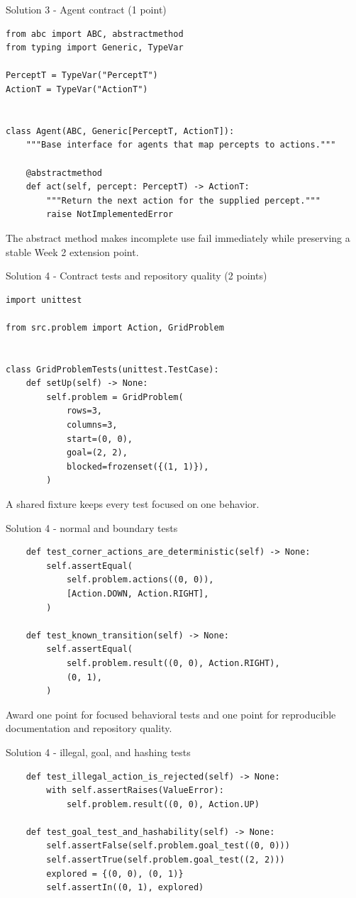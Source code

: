 \documentclass[aspectratio=169,11pt]{beamer}
\begin{document}
\begin{frame}[fragile]{Solution 3 - Agent contract (1 point)}
\begin{lstlisting}
from abc import ABC, abstractmethod
from typing import Generic, TypeVar

PerceptT = TypeVar("PerceptT")
ActionT = TypeVar("ActionT")


class Agent(ABC, Generic[PerceptT, ActionT]):
    """Base interface for agents that map percepts to actions."""

    @abstractmethod
    def act(self, percept: PerceptT) -> ActionT:
        """Return the next action for the supplied percept."""
        raise NotImplementedError
\end{lstlisting}
  \answerlabel The abstract method makes incomplete use fail immediately while
  preserving a stable Week 2 extension point.
\end{frame}

\begin{frame}[fragile]{Solution 4 - Contract tests and repository quality (2 points)}
\begin{lstlisting}
import unittest

from src.problem import Action, GridProblem


class GridProblemTests(unittest.TestCase):
    def setUp(self) -> None:
        self.problem = GridProblem(
            rows=3,
            columns=3,
            start=(0, 0),
            goal=(2, 2),
            blocked=frozenset({(1, 1)}),
        )
\end{lstlisting}
\answerlabel A shared fixture keeps every test focused on one behavior.
\end{frame}

\begin{frame}[fragile]{Solution 4 - normal and boundary tests}
\begin{lstlisting}
    def test_corner_actions_are_deterministic(self) -> None:
        self.assertEqual(
            self.problem.actions((0, 0)),
            [Action.DOWN, Action.RIGHT],
        )

    def test_known_transition(self) -> None:
        self.assertEqual(
            self.problem.result((0, 0), Action.RIGHT),
            (0, 1),
        )
\end{lstlisting}
\gradinglabel Award one point for focused behavioral tests and one point for
reproducible documentation and repository quality.
\end{frame}

\begin{frame}[fragile]{Solution 4 - illegal, goal, and hashing tests}
\begin{lstlisting}
    def test_illegal_action_is_rejected(self) -> None:
        with self.assertRaises(ValueError):
            self.problem.result((0, 0), Action.UP)

    def test_goal_test_and_hashability(self) -> None:
        self.assertFalse(self.problem.goal_test((0, 0)))
        self.assertTrue(self.problem.goal_test((2, 2)))
        explored = {(0, 0), (0, 1)}
        self.assertIn((0, 1), explored)
\end{lstlisting}
\end{frame}
\end{document}
